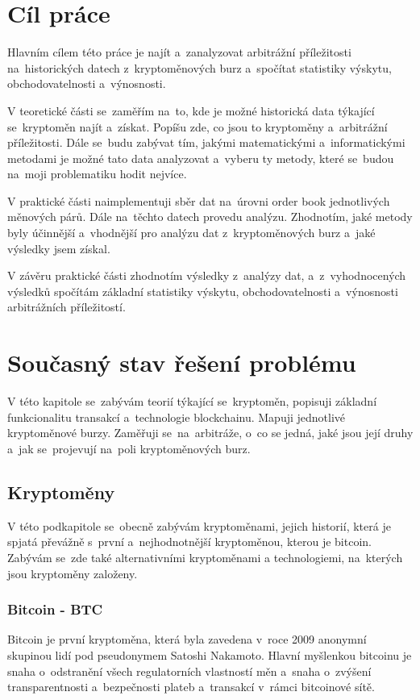 \documentclass[thesis=B,czech]{FITthesis}[2019/03/21]
\begin{document}
\chapter{Cíl práce}
Hlavním cílem této práce je najít a~zanalyzovat arbitrážní příležitosti na~historických datech z~kryptoměnových burz a~spočítat statistiky výskytu, obchodovatelnosti a~výnosnosti. 

V teoretické části se~zaměřím na~to, kde je možné historická data týkající se~kryptoměn najít a~získat. Popíšu zde, co jsou to kryptoměny a~arbitrážní příležitosti. Dále se~budu zabývat tím, jakými matematickými a~informatickými metodami je možné tato data analyzovat a~vyberu ty metody, které se~budou na~moji problematiku hodit nejvíce.

V praktické části naimplementuji sběr dat na~úrovni order book jednotlivých měnových párů. Dále na~těchto datech provedu analýzu. Zhodnotím, jaké metody byly účinnější a~vhodnější pro analýzu dat z~kryptoměnových burz a~jaké výsledky jsem získal.

V závěru praktické části zhodnotím výsledky z~analýzy dat, a~z~vyhodnocených výsledků spočítám základní statistiky výskytu, obchodovatelnosti a~výnosnosti arbitrážních příležitostí. 

\chapter{Současný stav řešení problému}
V této kapitole se~zabývám teorií týkající se~kryptoměn, popisuji základní funkcionalitu transakcí a~technologie blockchainu. Mapuji jednotlivé kryptoměnové burzy. Zaměřuji se~na~arbitráže, o~co se jedná, jaké jsou její druhy a~jak se~projevují na~poli kryptoměnových burz.

\section{Kryptoměny}
V této podkapitole se~obecně zabývám kryptoměnami, jejich historií, která je spjatá převážně s~první a~nejhodnotnější kryptoměnou, kterou je bitcoin. Zabývám se~zde také alternativními kryptoměnami a technologiemi, na~kterých jsou kryptoměny založeny. \cite{BudoucnostFinTrhu}

\subsection{Bitcoin - BTC}
Bitcoin je první kryptoměna, která byla zavedena v~roce 2009 anonymní skupinou lidí pod pseudonymem Satoshi Nakamoto. Hlavní myšlenkou bitcoinu je snaha o~odstranění všech regulatorních vlastností měn a~snaha o~zvýšení transparentnosti a~bezpečnosti plateb a~transakcí v~rámci bitcoinové sítě. \cite{Finex}
\end{document}
